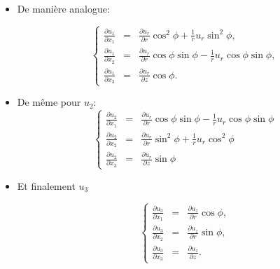 \documentclass[french]{beamer}
\begin{document}
\begin{frame} 

\begin{itemize}
  \item De manière analogue:


	
      \begin{equation*}
	\left \{
	  \begin{array}{ccc}
\frac{\partial u_1}{\partial x_1} &=& \frac{\partial u_r}{\partial r}\cos^2\phi + \frac{1}{r} u_r\sin^2\phi,\nonumber \\
\frac{\partial u_1}{\partial x_2} &=& \frac{\partial u_r}{\partial r}\cos\phi\sin\phi - \frac{1}{r}u_r \cos\phi\sin\phi, \nonumber \\
\frac{\partial u_1}{\partial x_3} &=&\frac{\partial u_r}{\partial z}\cos\phi. \nonumber
	  \end{array}
	  \right.
	\end{equation*}
	
\pause
 \item De même pour $u_2$:
      \begin{equation*}
	\left \{
	  \begin{array}{ccc}

\frac{\partial u_2}{\partial x_1} &=& \frac{\partial u_r}{\partial r}\cos\phi\sin\phi - \frac{1}{r}u_r \cos\phi\sin\phi \\
\frac{\partial u_2}{\partial x_2} &=& \frac{\partial u_r}{\partial r}\sin^2\phi + \frac{1}{r} u_r\cos^2\phi \\
\frac{\partial u_2}{\partial x_3} &=& \frac{\partial u_r}{\partial z}\sin\phi
	  \end{array}
	  \right.
	\end{equation*}

	
  \end{itemize}
\end{frame}	


\begin{frame}
  \begin{itemize}
 \item Et finalement $u_3$
 
       \begin{equation*}
	\left \{
	  \begin{array}{ccc}	  
\frac{\partial u_3}{\partial x_1} &=& \frac{\partial u_z}{\partial r}\cos\phi, \nonumber \\
\frac{\partial u_3}{\partial x_2} &=& \frac{\partial u_z}{\partial r}\sin\phi,\nonumber \\
\frac{\partial u_3}{\partial x_3} &=& \frac{\partial u_z}{\partial z}. \nonumber
	  \end{array}
	  \right.
	\end{equation*}
  \end{itemize}
\end{frame}
\end{document}
